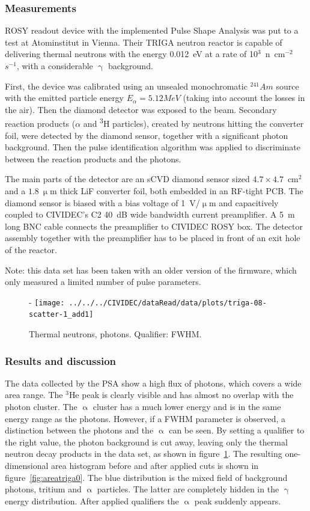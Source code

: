 \subsubsection{Measurements}
ROSY readout device with the implemented Pulse Shape Analysis was put to a test at Atominstitut in Vienna. Their TRIGA neutron reactor is capable of delivering thermal neutrons with the energy 0.012~eV at a rate of 10$^3$~n~cm$^{-2}$ $s^{-1}$, with a considerable $\upgamma$ background. 

First, the device was calibrated using an unsealed monochromatic $^{241}Am$ source with the emitted particle energy $E_\alpha=5.12MeV$ (taking into account the losses in the air). Then the diamond detector was exposed to the beam. Secondary reaction products ($\alpha$ and \textsuperscript{3}H particles), created by neutrons hitting the converter foil, were detected by the diamond sensor, together with a significant photon background. Then the pulse identification algorithm was applied to discriminate between the reaction products and the photons.

The main parts of the detector are an sCVD diamond sensor sized $4.7\times4.7$~cm$^2$ and a $1.8~\upmu$m thick LiF converter foil, both embedded in an RF-tight PCB. The diamond sensor is biased with a bias voltage of 1~V/$\upmu$m  and capacitively coupled to CIVIDEC's C2 40~dB wide bandwidth current preamplifier. A 5~m long BNC cable connects the preamplifier to CIVIDEC ROSY box. The detector assembly together with the preamplifier has to be placed in front of an exit hole of the reactor.

Note: this data set has been taken with an older version of the firmware, which only measured a limited number of pulse parameters.

\begin{figure}[]
\centering-
\texttt{[image: ../../../CIVIDEC/dataRead/data/plots/triga-08-scatter-1\_add1]}
\caption{Thermal neutrons, photons. Qualifier: FWHM.}
\label{fig:scattertriga1}
\end{figure}

\subsubsection{Results and discussion}
The data collected by the PSA show a high flux of photons, which covers a wide area range. The $^3$He peak is clearly visible and has almost no overlap with the photon cluster. The $\upalpha$ cluster has a much lower energy and is in the same energy range as the photons. However, if a FWHM parameter is observed, a distinction between the photons and the $\upalpha$ can be seen. By setting a qualifier to the right value, the photon background is cut away, leaving only the thermal neutron decay products in the data set, as shown in figure~\ref{fig:scattertriga1}. The resulting one-dimensional area histogram before and after applied cuts is shown in figure~\ref{fig:areatriga0}. The blue distribution is the mixed field of background photons, tritium and $\upalpha$ particles. The latter are completely hidden in the $\upgamma$ energy distribution. After applied qualifiers the $\upalpha$ peak suddenly appears.


